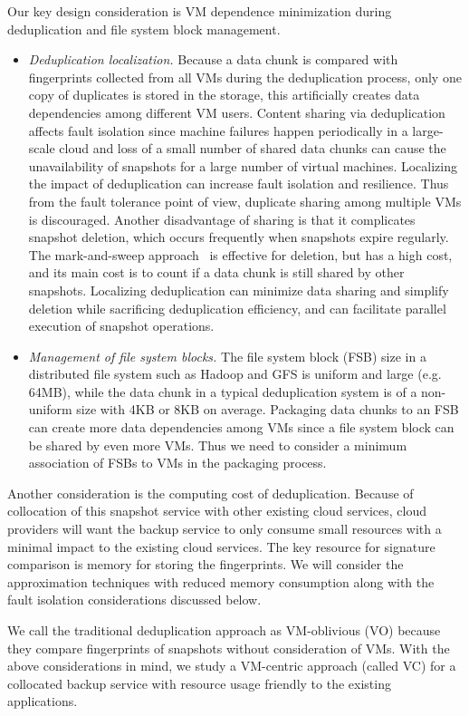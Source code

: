 Our key design consideration is VM dependence minimization during deduplication and file system block management.
\begin{itemize}
\item {\em Deduplication localization.}
Because a data chunk is compared with fingerprints collected from all VMs during
the deduplication process, only one copy of duplicates is stored in the storage,
this artificially creates data dependencies among different VM users. 
Content sharing via deduplication affects fault isolation since machine failures happen periodically 
in a large-scale cloud and
loss of a small number of shared data chunks can 
cause the unavailability of snapshots for a large number of virtual machines.
Localizing the impact of deduplication can increase fault isolation and resilience.
Thus from the fault tolerance point of view,  duplicate sharing among multiple VMs is 
discouraged. 
Another disadvantage of sharing is that it complicates snapshot deletion, 
which  occurs frequently when snapshots expire regularly. 
The mark-and-sweep approach~\cite{Guo2011} is effective for deletion, but has a high cost, and its main cost
is to count if a data chunk is still shared by other snapshots.
Localizing deduplication can  minimize data sharing and simplify deletion while sacrificing 
deduplication efficiency, and  can facilitate parallel execution of snapshot operations.
\item{\em  Management of file system blocks.}
The file system block (FSB) size in a distributed file system such as  Hadoop and GFS is uniform and large (e.g.  64MB),
while the data chunk in a typical deduplication system is of a non-uniform size with 4KB or 8KB on average.
Packaging data chunks to an FSB can create more data dependencies among VMs
since a file system block can be shared by even more VMs.
Thus we need to consider a minimum association of FSBs to VMs in the packaging process.
\end{itemize}

Another consideration is the computing cost of deduplication.
Because of collocation of this snapshot service with other existing cloud services, 
cloud providers will want the backup service to only consume small resources
with a minimal impact to the existing cloud services.
The key resource for signature comparison  is memory for storing the fingerprints. 
We will consider the approximation techniques with reduced memory consumption along 
with the fault isolation considerations discussed below. 

We call the traditional deduplication approach as   VM-oblivious (VO)
because they compare fingerprints of snapshots without consideration of VMs.
With the above  considerations in mind, we study a 
VM-centric approach (called VC)
for a collocated backup service with resource usage friendly
to the existing applications.  


